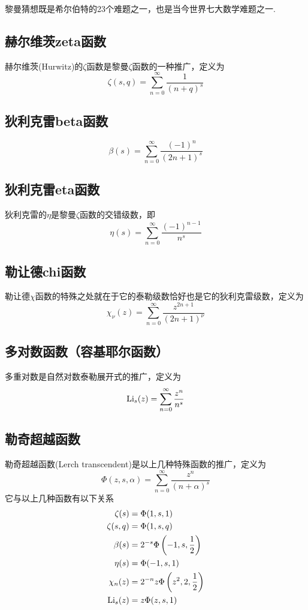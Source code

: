 \documentclass[main.tex]{subfiles}
\begin{document}
黎曼猜想既是希尔伯特的23个难题之一，也是当今世界七大数学难题之一.

\subsection{赫尔维茨zeta函数}

赫尔维茨(Hurwitz)的\(\zeta\)函数是黎曼\(\zeta\)函数的一种推广，定义为
\[ \zeta(s,q) = \sum_{n=0}^{\infty}\frac{1}{(n+q)^s} \]

\subsection{狄利克雷beta函数}

\[ \beta(s) = \sum_{n=0}^{\infty} \frac{(-1)^n}{(2n+1)^s}\]

\subsection{狄利克雷eta函数}

狄利克雷的\(\eta\)是黎曼\(\zeta\)函数的交错级数，即
\[ \eta(s) = \sum_{n=0}^{\infty} \frac{(-1)^{n-1}}{n^s}\]

\subsection{勒让德chi函数}

勒让德\(\chi\)函数的特殊之处就在于它的泰勒级数恰好也是它的狄利克雷级数，定义为
\[ \chi_{\nu}(z) = \sum_{n=0}^{\infty}\frac{z^{2n+1}}{(2n+1)^{\nu}} \]

\subsection{多对数函数（容基耶尔函数）}

多重对数是自然对数泰勒展开式的推广，定义为
\[ {\rm Li}_{s}(z) = \sum_{n=0}^{\infty}\frac{z^n}{n^s}\]

\subsection{勒奇超越函数}

勒奇超越函数(Lerch transcendent)是以上几种特殊函数的推广，定义为
\[ \Phi(z,s,\alpha) = \sum_{n=0}^{\infty} \frac{z^n}{(n+\alpha)^s} \]
它与以上几种函数有以下关系
\begin{align*}
    \zeta(s) &= \Phi(1,s,1) \\
    \zeta(s,q) &= \Phi(1,s,q) \\
    \beta(s) &= 2^{-s}\Phi\left(-1,s,\frac{1}{2}\right) \\
    \eta(s) &= \Phi(-1,s,1) \\
    \chi_n(z) &= 2^{-n}z\Phi\left(z^2,2,\frac{1}{2}\right) \\
    {\rm Li}_s(z) &= z\Phi(z,s,1)
\end{align*}
\end{document}
